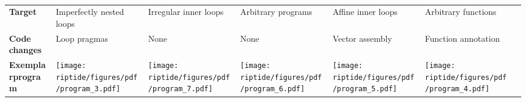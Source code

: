 {\begin{table*}[t]
{\begin{tabular}{p{0.4in}P{1.25in}P{1.25in}P{1.25in}P{1.25in}P{1.25in}P{1.35in}}
                        \bf Target
                        & Imperfectly nested loops
                        & Irregular inner loops
                        & Arbitrary programs
                        & Affine inner loops
                        & Arbitrary functions \\[1.5ex]
                        \bf Code changes
                        & Loop pragmas
                        & None
                        & None
                        & Vector assembly
                        & Function annotation \\[.5ex]
                        \bf \vspace{-6.25em}Exemplar\newline program
                        &
			\texttt{[image: riptide/figures/pdf/program\_3.pdf]} &
			\texttt{[image: riptide/figures/pdf/program\_7.pdf]} &
			\texttt{[image: riptide/figures/pdf/program\_6.pdf]} &
			\texttt{[image: riptide/figures/pdf/program\_5.pdf]} &
			\texttt{[image: riptide/figures/pdf/program\_4.pdf]} \\
			\bottomrule
		\end{tabular}
	}
	\caption{
        }
	\label{tab:riptide:background}
\end{table*}
}


